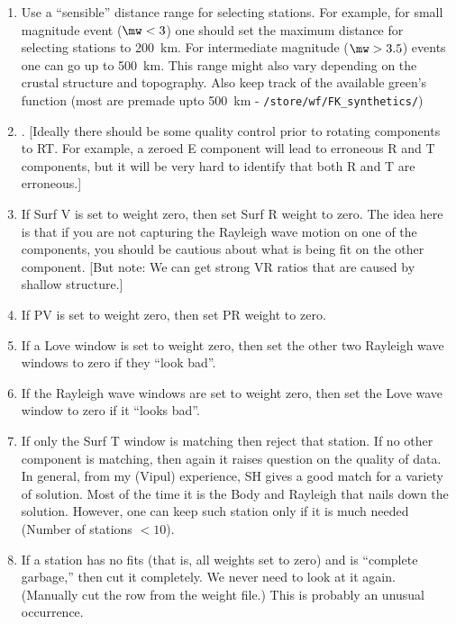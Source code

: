 \begin{enumerate}
\begin{enumerate}
\item Use a ``sensible'' distance range for selecting stations. For example, for small magnitude event ($\mw < 3$) one should set the maximum distance for selecting stations to 200~km. For intermediate magnitude ($\mw > 3.5$) events one can go up to 500~km. This range might also vary depending on the crustal structure and topography. Also keep track of the available green's function (most are premade upto 500~km - \verb+/store/wf/FK_synthetics/+)

\item . [Ideally there should be some quality control prior to rotating components to RT. For example, a zeroed E component will lead to erroneous R and T components, but it will be very hard to identify that both R and T are erroneous.]

\item If Surf V is set to weight zero, then set Surf R weight to zero. The idea here is that if you are not capturing the Rayleigh wave motion on one of the components, you should be cautious about what is being fit on the other component. [But note: We can get strong VR ratios that are caused by shallow structure.] 

\item If PV is set to weight zero, then set PR weight to zero.

\item If a Love window is set to weight zero, then set the other two Rayleigh wave windows to zero if they ``look bad''.

\item If the Rayleigh wave windows are set to weight zero, then set the Love wave window to zero if it ``looks bad''.

\item If only the Surf T window is matching then reject that station. If no other component is matching, then again it raises question on the quality of data. In general, from my (Vipul) experience, SH gives a good match for a variety of solution. Most of the time it is the Body and Rayleigh that nails down the solution. However, one can keep such station only if it is much needed (Number of stations $< 10$).

\item If a station has no fits (that is, all weights set to zero) and is ``complete garbage,'' then cut it completely. We never need to look at it again. (Manually cut the row from the weight file.) This is probably an unusual occurrence.


\end{enumerate}
\end{enumerate}
